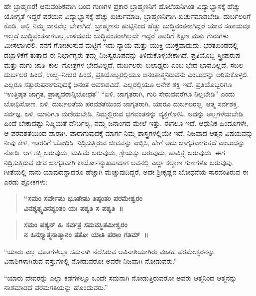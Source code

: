 ಹೇ ಬ್ರಾಹ್ಮಣರೆ! ಆನುವಂಶಿಕವಾಗಿ ಬಂದ ಗುಣಗಳ ಪ್ರಕಾರ ಬ್ರಾಹ್ಮಣನಿಗೆ ಹೊಲೆಯನಿಗಿಂತ ವಿದ್ಯಾಭ್ಯಾಸಕ್ಕೆ ಹೆಚ್ಚು ಯೋಗ್ಯತೆ ಇದ್ದರೆ ಪರೆಯನ ವಿದ್ಯಾಭ್ಯಾಸಕ್ಕೆ ಹೆಚ್ಚು ಖರ್ಚುಮಾಡಿ, ಬ್ರಾಹ್ಮಣನಿಗಾಗಿ ಖರ್ಚುಮಾಡಬೇಡಿ. ದುರ್ಬಲರಿಗೆ ಕೊಡಿ. ಅಲ್ಲಿ ನಿಮ್ಮ ದಾನವೆಲ್ಲ ಬೇಕಾಗಿದೆ. ಬ್ರಾಹ್ಮಣನು ಹುಟ್ಟಿನಿಂದ ಹೆಚ್ಚು ಬುದ್ಧಿವಂತನಾಗಿದ್ದರೆ ಯಾವ ಸಹಾಯವೂ ಇಲ್ಲದೆ ಬುದ್ಧಿವಂತನಾಗಬಲ್ಲ.\break ಉಳಿದವರು ಬುದ್ಧಿವಂತರಾಗಿಲ್ಲದೇ ಇದ್ದರೆ ಅವರಿಗೆ ಶಿಕ್ಷಣ ಮತ್ತು ಗುರುಗಳು ಮೀಸಲಾಗಿರಲಿ. ನನಗೆ ಗೋಚರಿಸುವ ಮಟ್ಟಿಗೆ ಇದು ನ್ಯಾಯ ಮತ್ತು ಯುಕ್ತಿ ಯುಕ್ತವಾದುದು. ಭರತಖಂಡದಲ್ಲಿ ದಬ್ಬಾಳಿಕೆಗೆ ತುತ್ತಾದ ಈ ನಿರ್ಭಾಗ್ಯರು ತಮ್ಮ ನಿಜಸ್ವರೂಪವನ್ನು ತಿಳಿದುಕೊಳ್ಳಬೇಕಾಗಿದೆ. ಪ್ರತಿಯೊಬ್ಬ ಸ್ತ್ರೀಪುರುಷ ಮತ್ತು ಮಗು ಜಾತಿ–ಕುಲ–ಗೋತ್ರಗಳ ಭೇದವಿಲ್ಲದೆ, ದುರ್ಬಲರು–ಬಲಾಢ್ಯರು ಎಂಬ ಭೇದ ಭಾವವಿಲ್ಲದೆ, ಸಬಲ–ದುರ್ಬಲರ ಹಿಂದೆ, ಉಚ್ಚ–ನೀಚರ ಹಿಂದೆ, ಪ್ರತಿಯೊಬ್ಬರಲ್ಲಿಯೂ ಅನಂತಾತ್ಮನಿರುವನು ಎಂಬುದನ್ನು ಅರಿತುಕೊಳ್ಳಲಿ. ಎಲ್ಲರೂ ಸತ್ಪುರುಷರಾಗುವುದಕ್ಕೆ ಅನಂತ ಅವಕಾಶವಿದೆ. ಎಲ್ಲರಲ್ಲಿಯೂ ಅನೇಕ ಶಕ್ತಿ ಇದೆ. ಪ್ರತಿಯೊಬ್ಬರಿಗೂ “ಉತ್ತಿಷ್ಠತ ಜಾಗ್ರತ, ಪ್ರಾಪ್ಯವರಾನ್ನಿಬೋಧತ” “ಏಳಿ, ಜಾಗೃತರಾಗಿ, ಗುರಿ ಸೇರುವವರೆಗೂ ನಿಲ್ಲಬೇಡಿ” ಎಂದು ಬೋಧಿಸೋಣ. ಏಳಿ, ದುರ್ಬಲತೆಯ ಪರವಶತೆಯಿಂದ ಜಾಗೃತರಾಗಿ. ಯಾರೂ ದುರ್ಬಲರಲ್ಲ. ಆತ್ಮ ಸರ್ವಶಕ್ತ, ಸರ್ವಜ್ಞ. ಏಳಿ, ಯಾರಿಗೂ ಮಣಿಯಬೇಡಿ. ನಿಮ್ಮಲ್ಲಿರುವ ಭಗವಂತನನ್ನು ವ್ಯಕ್ತಗೊಳಿಸಿ. ಅದನ್ನು ಅಲ್ಲಗಳೆಯಬೇಡಿ. ಹಿಂದೆ ಬೇಕಾದಷ್ಟು ನಿಷ್ಕ್ರಿಯತೆ ದೌರ್ಬಲ್ಯ, ನಮ್ಮ ಜನಾಂಗದ ಮೇಲೆ ಇತ್ತು. ಈಗಲೂ ಇದೆ. ಆಧುನಿಕ ಹಿಂದೂಗಳೇ, ಆ ಪರವಶತೆಯಿಂದ ಪಾರಾಗಿ. ಪಾರಾಗುವುದಕ್ಕೆ ಮಾರ್ಗ ನಿಮ್ಮ ಶಾಸ್ತ್ರಗಳಲ್ಲಿಯೇ ಇದೆ. ನಿಜವಾದ ಆತ್ಮನ ವಿಷಯವನ್ನು ನೀವು ಕೇಳಿ, ಇತರರಿಗೆ ಬೋಧಿಸಿ. ನಿದ್ರಿಸುತ್ತಿರುವ ಜೀವವನ್ನು ಎಬ್ಬಿಸಿ, ಹೇಗೆ ಅದು ಜಾಗೃತವಾಗುತ್ತದೆ ಎಂಬುದನ್ನು ನೋಡಿ. ಆಗ ಶಕ್ತಿ ಬರುವುದು, ಮಹಿಮೆ ಬರುವುದು, ಶ್ರೇಯಸ್ಸು ಬರುವುದು, ಪಾವಿತ್ರ್ಯ ಬರುವುದು. ಈಗ ನಿದ್ರಿಸುತ್ತಿರುವ ಜೀವ ಜಾಗೃತವಾಗಿ ಕಾರ್ಯೋನ್ಮುಖವಾದಾಗ ಅವನಲ್ಲಿ ಎಲ್ಲಾ ಕಲ್ಯಾಣ ಗುಣಗಳೂ ಬರುವುವು. ಗೀತೆಯಲ್ಲಿ ನಾನು ಯಾವುದನ್ನಾದರೂ ಹೆಚ್ಚಾಗಿ ಮೆಚ್ಚುವುದಿದ್ದರೆ, ಅದೇ ಶ‍್ರೀಕೃಷ್ಣನ ಬೋಧನೆಯ ಸಾರದಂತಿರುವ ಈ ಎರಡು ಶ್ಲೋಕಗಳು:

\begin{verse}
\textbf{“ಸಮಂ ಸರ್ವೇಷು ಭೂತೇಷು ತಿಷ್ಠಂತಂ ಪರಮೇಶ್ವರಂ}\\\textbf{ವಿನಶ್ಯತ್ಸ್ವವಿನಶ್ಯಂತಂ ಯಃ ಪಶ್ಯತಿ ಸ ಪಶ್ಯತಿ~॥} 
\end{verse}

\begin{verse}
\textbf{ಸಮಂ ಪಶ್ಯನ್​ ಹಿ ಸರ್ವತ್ರ ಸಮವಸ್ಥಿತಮೀಶ್ವರಂ}\\\textbf{ನ ಹಿನಸ್ತ್ಯಾತ್ಮನಾತ್ಮಾನಂ ತತೋ ಯಾತಿ ಪರಾಂ ಗತಿಮ್​~॥}
\end{verse}

\newpage

“ಯಾರು ಎಲ್ಲ ಭೂತಗಳಲ್ಲೂ ಸಮನಾಗಿ ನೆಲೆಸಿರುವ ಅವಿನಾಶಿಯಾಗಿರು ವಂತಹ ಪರಮೇಶ್ವರನನ್ನು ವಿನಾಶಿಗಳಾಗಿರುವ ವಸ್ತುಗಳಲ್ಲಿ ನೋಡುವರೋ ಅವರೇ ನಿಜವಾಗಿ ನೋಡುವರು.”

“ಯಾರು ದೇವರನ್ನು ಎಲ್ಲಾ ಕಡೆಗಳಲ್ಲೂ ಒಂದೇ ಸಮನಾಗಿ ನೋಡುತ್ತಿರುವರೋ ಅವರು ಆತ್ಮನಿಂದ ಆತ್ಮನನ್ನು ನಾಶಮಾಡದೆ ಪರಮಗತಿಯನ್ನು ಹೊಂದುವರು.”

